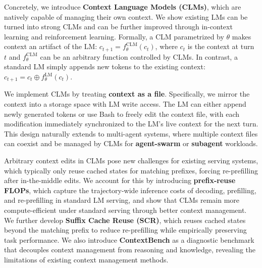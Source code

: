 \documentclass{fairmeta}
\newcommand{\clmhl}[1]{\textcolor{clmblue}{\textbf{#1}}}
\newcommand{\ours}{CLM\xspace}
\newcommand{\oursplural}{CLMs\xspace}
\newcommand{\OURSplural}{Context Language Models\xspace}
\newcommand{\ourbench}{ContextBench\xspace}
\begin{document}
Concretely, we introduce \clmhl{\OURSplural{} (\oursplural{})}, which are natively capable of managing their own context.
We show existing LMs can be turned into strong \oursplural 
and can be further improved through in-context learning and reinforcement learning.
Formally, a \ours parametrized by \(\theta\) makes context an artifact of the LM: 
$c_{t+1} = f^{\mathrm{CLM}}_\theta(c_t)$, where $c_t$ is the context at turn $t$ and $f^{\mathrm{CLM}}_\theta$ can be an arbitrary function controlled by \oursplural.
In contrast, a standard LM simply appends new tokens to the existing context: 
$c_{t+1} = c_t \oplus f^{\mathrm{LM}}_\theta(c_t)$.

We implement \oursplural by treating \clmhl{context as a file}.
Specifically, we mirror the context into a storage space with LM write access. The LM can either append newly generated tokens or use Bash  to freely edit the context file, with each modification immediately synchronized to the LM's live context for the next turn.
This design naturally extends to multi-agent systems, where multiple context files can coexist and be managed by \oursplural for \clmhl{agent-swarm} or \clmhl{subagent} workloads.

Arbitrary context edits in \oursplural pose new challenges for existing serving systems, which typically only reuse cached states for matching prefixes, forcing re-prefilling after in-the-middle edits. 
We account for this by introducing \clmhl{prefix-reuse FLOPs}, which capture the trajectory-wide inference costs of decoding, prefilling, and re-prefilling in standard LM serving,
and show that \oursplural{} remain more compute-efficient under standard serving through better context management. 
We further develop \clmhl{Suffix Cache Reuse (SCR)}, which reuses cached states beyond the matching prefix to reduce re-prefilling while empirically preserving task performance.
We also introduce \clmhl{\ourbench} as a diagnostic benchmark that decouples context management from reasoning and knowledge, revealing the limitations of existing context management methods.
\end{document}
